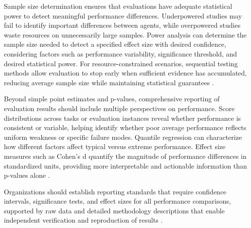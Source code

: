 \begin{TNtwocol}
Sample size determination ensures that evaluations have adequate statistical power to detect meaningful performance differences. Underpowered studies may fail to identify important differences between agents, while overpowered studies waste resources on unnecessarily large samples. Power analysis can determine the sample size needed to detect a specified effect size with desired confidence, considering factors such as performance variability, significance threshold, and desired statistical power. For resource-constrained scenarios, sequential testing methods allow evaluation to stop early when sufficient evidence has accumulated, reducing average sample size while maintaining statistical guarantees \cite{dror2018,reimers2017}.

Beyond simple point estimates and p-values, comprehensive reporting of evaluation results should include multiple perspectives on performance. Score distributions across tasks or evaluation instances reveal whether performance is consistent or variable, helping identify whether poor average performance reflects uniform weakness or specific failure modes. Quantile regression can characterize how different factors affect typical versus extreme performance. Effect size measures such as Cohen's d quantify the magnitude of performance differences in standardized units, providing more interpretable and actionable information than p-values alone \cite{dror2018,card2020}.

Organizations should establish reporting standards that require confidence intervals, significance tests, and effect sizes for all performance comparisons, supported by raw data and detailed methodology descriptions that enable independent verification and reproduction of results \cite{dror2018,reimers2017}.
\end{TNtwocol}
